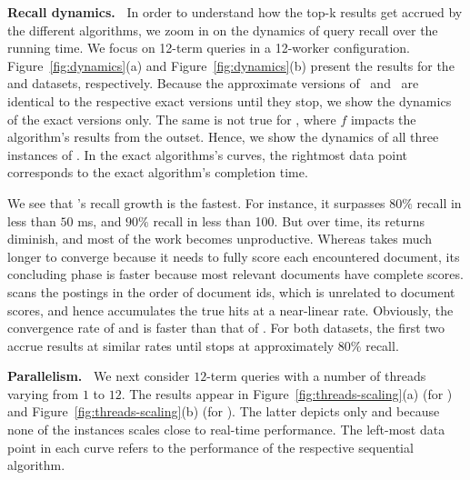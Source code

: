 {\bf Recall dynamics.\ } 
In order to understand how the top-k results get accrued by the different algorithms, we zoom in on the dynamics of query 
recall over the running time. We focus on 12-term queries in a 12-worker configuration. 
Figure~\ref{fig:dynamics}(a) and Figure~\ref{fig:dynamics}(b) present the results for the \cw\/ and \cwten\/ datasets, respectively. 
Because the approximate versions of \alg\ and \pRA\ are  identical to the respective exact versions until they stop, 
we show the dynamics of the exact versions only.  The same is not true for \pBMW, where $f$ impacts the algorithm's results from the outset.
Hence, we show the dynamics of all three instances of \pBMW. 
In the exact algorithms's curves, the rightmost data point corresponds to the exact algorithm's completion time.   

We see that \alg's recall growth is the fastest. For instance, it surpasses $80\%$ recall in less than $50$ ms, 
and $90\%$ recall in less than 100. But over time, its returns  diminish, and most of the work becomes unproductive. Whereas
\pRA\/ takes much longer to converge because it needs to fully score each encountered document,  its concluding phase is faster because 
most relevant documents   have complete  scores. 
\pBMW\/ scans the postings in the order of document ids, which is unrelated to document scores, and hence accumulates the true hits 
at a near-linear rate. Obviously, the convergence rate of \pBMW\hi\/ and \pBMW\lo\/ is faster than that of \pBMW\ex. For both datasets, the first 
two accrue results at similar rates until \pBMW\lo\/ stops at approximately $80\%$ recall. 

{\bf Parallelism.\ } 
We next consider  $12$-term queries with a number of threads varying from $1$ to $12$. 
The results appear in Figure~\ref{fig:threads-scaling}(a) (for \cw) and Figure~\ref{fig:threads-scaling}(b) (for \cwten). The latter depicts only \alg\/ and \pRA\/ 
because none of the \pBMW\/ instances scales close to real-time performance.  The left-most data point in each curve refers to the performance of 
the respective sequential algorithm.

